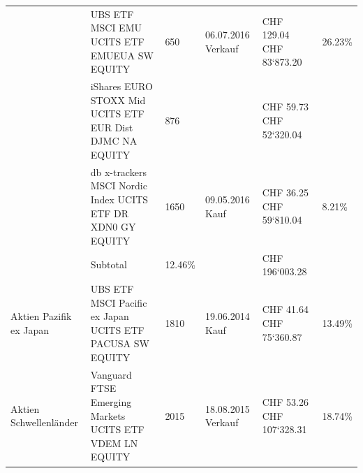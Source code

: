 \documentclass[9pt,landscape,a4paper]{report}
\begin{document}
\begin{longtable}{L{5.5cm} L{5.5cm} R{2.5cm} R{2.5cm} R{2.5cm} R{3cm}}
\newline & UBS ETF MSCI EMU UCITS ETF \newline EMUEUA SW EQUITY \newline  & 650  & 06.07.2016 \newline Verkauf & CHF  129.04 \newline CHF 83`873.20 & 26.23{\%}  \\  & iShares EURO STOXX Mid UCITS ETF EUR Dist \newline DJMC NA EQUITY \newline  & 876  &  \newline   & CHF  59.73 \newline CHF 52`320.04 &   \\  & db x-trackers MSCI Nordic Index UCITS ETF DR \newline XDN0 GY EQUITY \newline  & 1650  & 09.05.2016 \newline Kauf & CHF  36.25 \newline CHF 59`810.04 & 8.21{\%}  \\* \hline  \bf{} & Subtotal & 12.46\% & & CHF  196`003.28 & \\ \hline  {}  Aktien Pazifik ex Japan \newline & UBS ETF MSCI Pacific ex Japan UCITS ETF \newline PACUSA SW EQUITY \newline  & 1810  & 19.06.2014 \newline Kauf & CHF  41.64 \newline CHF 75`360.87 & 13.49{\%}  \\ \hline Aktien Schwellenländer \newline & Vanguard FTSE Emerging Markets UCITS ETF \newline VDEM LN EQUITY \newline  & 2015  & 18.08.2015 \newline Verkauf & CHF  53.26 \newline CHF 107`328.31 & 18.74{\%} \newline 
\end{longtable}
\end{document}
